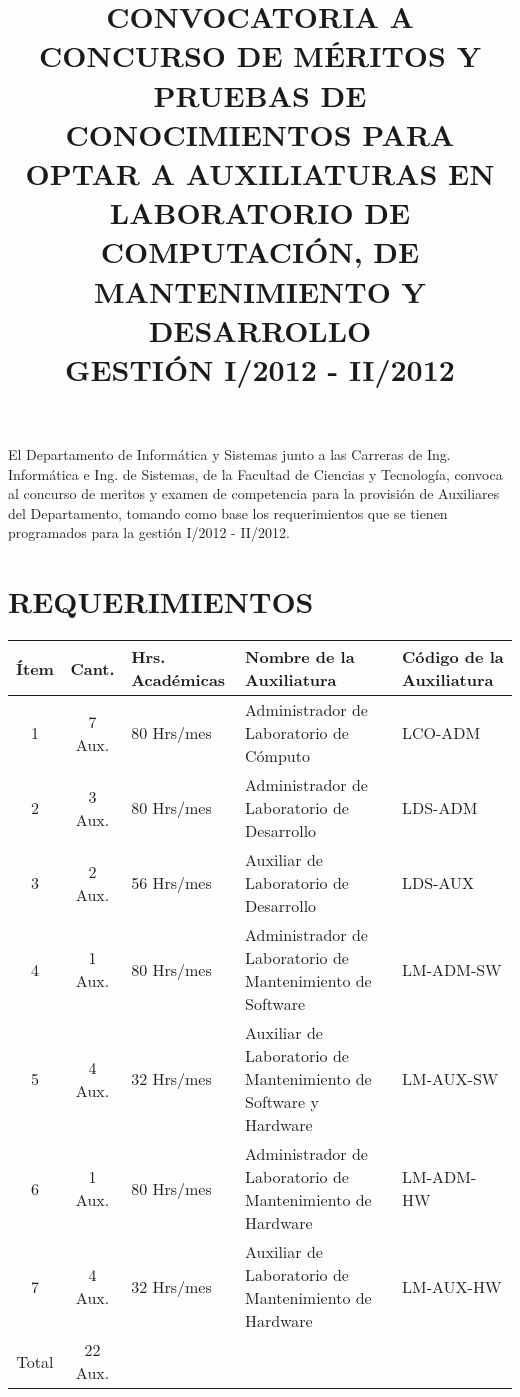 \documentclass[letterpaper,11pt]{article}
\title{CONVOCATORIA A CONCURSO DE MÉRITOS Y PRUEBAS DE CONOCIMIENTOS PARA OPTAR A AUXILIATURAS EN LABORATORIO DE COMPUTACIÓN, DE MANTENIMIENTO Y DESARROLLO\\GESTIÓN I/2012 - II/2012\\}
\date{}
\begin{document}
\maketitle
El Departamento de Informática y Sistemas junto a las Carreras de Ing. Informática e Ing. de Sistemas, de la Facultad de Ciencias y Tecnología, convoca al concurso de meritos y examen de competencia para la provisión de Auxiliares del Departamento, tomando como base los requerimientos que se tienen programados para la gestión I/2012 - II/2012.

\section{REQUERIMIENTOS}
\begin{tabular}{|c|c|p{2.8cm}|p{5.2cm}|p{2.8cm}|}
\hline
 \textbf{Ítem} & \textbf{Cant.} & \textbf{Hrs. Académicas} & \textbf{Nombre de la Auxiliatura} & \textbf{Código de la Auxiliatura} \\
\hline
 1 & 7 Aux. & 80 Hrs/mes & Administrador de Laboratorio de Cómputo & LCO-ADM \\
\hline
 2 & 3 Aux. & 80 Hrs/mes & Administrador de Laboratorio de Desarrollo & LDS-ADM \\
\hline
 3 & 2 Aux. & 56 Hrs/mes & Auxiliar de Laboratorio de Desarrollo & LDS-AUX \\
\hline
 4 & 1 Aux. & 80 Hrs/mes & Administrador de Laboratorio de Mantenimiento de Software & LM-ADM-SW \\
\hline
 5 & 4 Aux. & 32 Hrs/mes & Auxiliar de Laboratorio de Mantenimiento de Software y Hardware & LM-AUX-SW \\
\hline
 6 & 1 Aux. & 80 Hrs/mes & Administrador de Laboratorio de Mantenimiento de Hardware & LM-ADM-HW \\
\hline
 7 & 4 Aux. & 32 Hrs/mes & Auxiliar de Laboratorio de Mantenimiento de Hardware & LM-AUX-HW \\
\hline
 Total & 22 Aux. & \multicolumn{3}{|l|}{} \\
\hline
\end{tabular}
\end{document}
